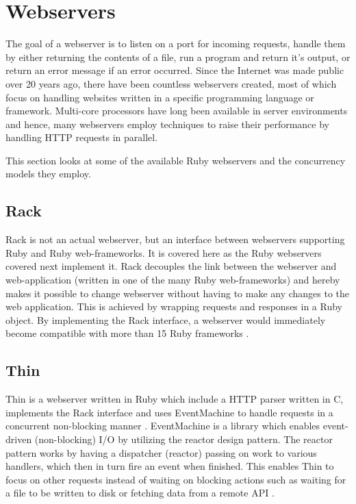 \section{Webservers}
\label{webservers}

The goal of a webserver is to listen on a port for incoming requests, handle them
by either returning the contents of a file, run a program and return it's
output, or return an error message if an error occurred. Since the Internet was
made public over 20 years ago, there have been countless webservers created, most
of which focus on handling websites written in a specific programming language
or framework. Multi-core processors have long been available in server
environments and hence, many webservers employ techniques to raise their
performance by handling HTTP requests in parallel.

This section looks at some of the available Ruby webservers and the
concurrency models they employ.

\subsection{Rack}
Rack is not an actual webserver, but an interface between webservers
supporting Ruby and Ruby web-frameworks. It is covered here as the Ruby
webservers covered next implement it. Rack decouples the link between the
webserver and web-application (written in one of the many Ruby web-frameworks) and
hereby makes it possible to change webserver without having to make any
changes to the web application. This is achieved by wrapping requests and
responses in a Ruby object. By implementing the Rack interface, a webserver
would immediately become compatible with more than 15 Ruby frameworks
\cite{rackspec}.

\subsection{Thin}
Thin is a webserver written in Ruby which include a HTTP parser written in C,
implements the Rack interface and uses EventMachine to handle requests in a
concurrent non-blocking manner \cite{thin}. EventMachine is a library which enables
event-driven (non-blocking) I/O by utilizing the reactor design pattern. The
reactor pattern works by having a dispatcher (reactor) passing on work to
various handlers, which then in turn fire an event when finished. This enables
Thin to focus on other requests instead of waiting on blocking actions such as
waiting for a file to be written to disk or fetching data from a remote API
\cite{reactor}.

